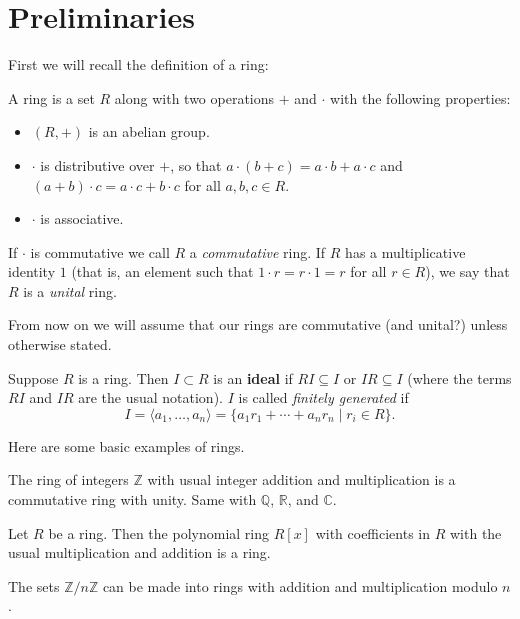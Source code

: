 




\section{Preliminaries}

First we will recall the definition of a ring:
\begin{definition}
A ring is a set $R$ along with two operations $+$ and $\cdot$ with the following properties:
\begin{itemize}
\item $(R, +)$ is an abelian group.
\item $\cdot$ is distributive over $+$, so that $a\cdot(b + c) = a \cdot b + a \cdot c$ and $(a + b) \cdot c = a \cdot c + b \cdot c$ for all $a, b, c \in R$.
\item $\cdot$ is associative.
\end{itemize}
If $\cdot$ is commutative we call $R$ a \textit{commutative} ring. If $R$ has a multiplicative identity $1$ (that is, an element such that $1\cdot r = r\cdot 1 = r$ for all $r \in R$), we say that $R$ is a \textit{unital} ring.
\end{definition}

From now on we will assume that our rings are commutative (and unital?) unless otherwise stated.

\begin{definition}
Suppose $R$ is a ring. Then $I \subset R$ is an \textbf{ideal} if $RI \subseteq I$ or $IR \subseteq I$ (where the terms $RI$ and $IR$ are the usual notation). $I$ is called \textit{finitely generated} if 
\[I = \langle a_1, \dots, a_n \rangle = \{a_1r_1 + \cdots + a_nr_n \mid r_i \in R\}.\]
\end{definition}

Here are some basic examples of rings.

\begin{example}
The ring of integers $\mathbb{Z}$ with usual integer addition and multiplication is a commutative ring with unity. Same with $\mathbb{Q}$, $\mathbb{R}$, and $\mathbb{C}$.
\end{example}
\begin{example}
Let $R$ be a ring. Then the polynomial ring $R[x]$ with coefficients in $R$ with the usual multiplication and addition is a ring.
\end{example}
\begin{example}
The sets $\mathbb{Z}/n\mathbb{Z}$ can be made into rings with addition and multiplication modulo $n$.
\end{example}

